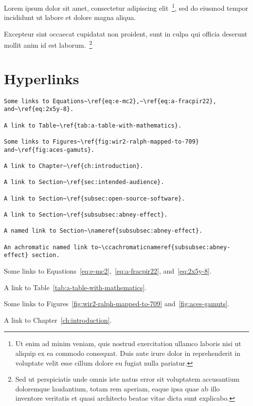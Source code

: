 Lorem ipsum dolor sit amet, consectetur adipiscing elit~\footnote{Ut enim ad
minim veniam, quis nostrud exercitation ullamco laboris nisi ut aliquip ex ea
commodo consequat. Duis aute irure dolor in reprehenderit in voluptate velit
esse cillum dolore eu fugiat nulla pariatur.}, sed do eiusmod tempor incididunt
ut labore et dolore magna aliqua.

\begin{center}
Excepteur sint occaecat cupidatat non proident, sunt in culpa qui officia
deserunt mollit anim id est laborum.~\footnote{Sed ut perspiciatis unde omnis
iste natus error sit voluptatem accusantium doloremque laudantium, totam rem
aperiam, eaque ipsa quae ab illo inventore veritatis et quasi architecto
beatae vitae dicta sunt explicabo.}
\end{center}

\section*{Hyperlinks}
\label{sec:hyperlinks}

\begin{lstlisting}[caption={Hyperlinks.}]
Some links to Equations~\ref{eq:e-mc2},~\ref{eq:a-fracpir22}, and~\ref{eq:2x5y-8}.

A link to Table~\ref{tab:a-table-with-mathematics}.

Some links to Figures~\ref{fig:wir2-ralph-mapped-to-709} and~\ref{fig:aces-gamuts}.

A link to Chapter~\ref{ch:introduction}.

A link to Section~\ref{sec:intended-audience}.

A link to Section~\ref{subsec:open-source-software}.

A link to Section~\ref{subsubsec:abney-effect}.

A named link to Section~\nameref{subsubsec:abney-effect}.

An achromatic named link to~\ccachromaticnameref{subsubsec:abney-effect} section.
\end{lstlisting}

Some links to Equations~\ref{eq:e-mc2},~\ref{eq:a-fracpir22}, and~\ref{eq:2x5y-8}.

A link to Table~\ref{tab:a-table-with-mathematics}.

Some links to Figures~\ref{fig:wir2-ralph-mapped-to-709} and~\ref{fig:aces-gamuts}.

A link to Chapter~\ref{ch:introduction}.

